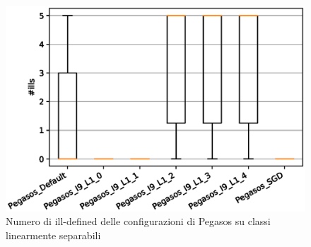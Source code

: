 \begin{figure}[hbp!]%
    \centering
    \includegraphics[scale = 0.80]{CC-Pegasos-ills-LS}%
    \caption{Numero di ill-defined delle configurazioni di Pegasos su classi linearmente separabili}%
    \label{figure:ill14}%
\end{figure}

\vspace*{\fill}


\vspace*{\fill}

